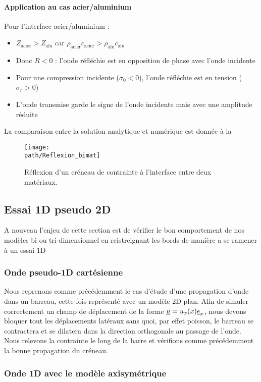 \documentclass[10pt]{book}
\def\path{./fig}
\begin{document}
\paragraph{Application au cas acier/aluminium}
Pour l'interface acier/aluminium :
\begin{itemize}
\item $Z_{\text{acier}} > Z_{\text{alu}}$ car $\rho_{\text{acier}}c_{\text{acier}} > \rho_{\text{alu}}c_{\text{alu}}$
\item Donc $R < 0$ : l'onde réfléchie est en opposition de phase avec l'onde incidente
\item Pour une compression incidente ($\sigma_0 < 0$), l'onde réfléchie est en tension ($\sigma_r > 0$)
\item L'onde transmise garde le signe de l'onde incidente mais avec une amplitude réduite
\end{itemize}
La comparaison entre la solution analytique et numérique est donnée à la 
\begin{figure}[h!]
\centering \texttt{[image: \\path/Reflexion\_bimat]}
\caption{Réflexion d'un créneau de contrainte à l'interface entre deux matériaux.}
\label{fig:Reflexion_bimat}
\end{figure}
\subsection{Essai 1D pseudo 2D}
A nouveau l'enjeu de cette section est de vérifier le bon comportement de nos modèles bi ou tri-dimensionnel en reistreignant les bords de manière a se ramener à un essai 1D
\subsubsection{Onde pseudo-1D cartésienne}
Nous reprenons comme précédemment le cas d'étude d'une propagation d'onde dans un barreau, cette fois représenté avec un modèle 2D plan. Afin de simuler correctement un champ de déplacement de la forme $\underline{u}=u_{x}(x)\underline{e}_{x}$, nous devons bloquer tout les déplacements latéraux sans quoi, par effet poisson, le barreau se contractera et se dilatera dans la direction orthogonale au passage de l'onde. Nous relevons la contrainte le long de la barre et vérifions comme précédemment la bonne propagation du créneau. 
\subsubsection{Onde 1D avec le modèle axisymétrique}
\end{document}
